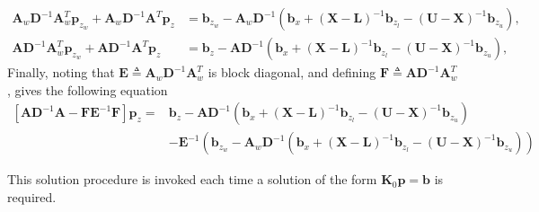 \documentclass[12pt]{article}
\newcommand{\mb}{\mathbf}
\begin{document}
\begin{equation}
  \begin{aligned}
    \mb{A}_{w}\mb{D}^{-1}\mb{A}_{w}^{T} \mb{p}_{z_{w}} + \mb{A}_{w}\mb{D}^{-1}\mb{A}^{T}\mb{p}_{z} &= \mb{b}_{z_{w}} - \mb{A}_{w}\mb{D}^{-1}\left(\mb{b}_{x} + (\mb{X} - \mb{L})^{-1}\mb{b}_{z_{l}} - (\mb{U} - \mb{X})^{-1}\mb{b}_{z_{u}} \right), \\
    \mb{A}\mb{D}^{-1}\mb{A}_{w}^{T} \mb{p}_{z_{w}} + \mb{A}\mb{D}^{-1}\mb{A}^{T}\mb{p}_{z} &= \mb{b}_{z} - \mb{A}\mb{D}^{-1}\left(\mb{b}_{x} + (\mb{X} - \mb{L})^{-1}\mb{b}_{z_{l}} - (\mb{U} - \mb{X})^{-1}\mb{b}_{z_{u}} \right),
  \end{aligned}
\end{equation}
%
Finally, noting that $\mb{E} \triangleq \mb{A}_{w}\mb{D}^{-1}\mb{A}_{w}^{T}$ is block diagonal, and defining $\mb{F} \triangleq \mb{A}\mb{D}^{-1}\mb{A}_{w}^{T}$, gives the following equation
\begin{equation*}
  \begin{aligned}
    \left[\mb{A}\mb{D}^{-1}\mb{A} - \mb{F}\mb{E}^{-1}\mb{F} \right]\mb{p}_{z} =& 
    \mb{b}_{z} - \mb{A}\mb{D}^{-1}\left(\mb{b}_{x} + (\mb{X} - \mb{L})^{-1}\mb{b}_{z_{l}} - (\mb{U} - \mb{X})^{-1}\mb{b}_{z_{u}} \right) \\
    & - \mb{E}^{-1}\left( \mb{b}_{z_{w}} - \mb{A}_{w}\mb{D}^{-1}\left(\mb{b}_{x} + (\mb{X} - \mb{L})^{-1}\mb{b}_{z_{l}} - (\mb{U} - \mb{X})^{-1}\mb{b}_{z_{u}} \right) \right)
  \end{aligned}
\end{equation*}

This solution procedure is invoked each time a solution of the form $\mb{K}_{0}\mb{p} = \mb{b}$ is required. 
\end{document}
